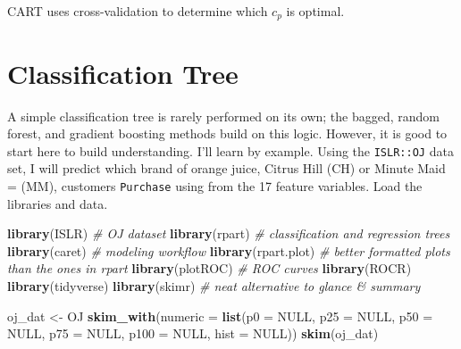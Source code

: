 \documentclass[]{book}
\newenvironment{Shaded}{\begin{snugshade}}{\end{snugshade}}
\newcommand{\CommentTok}[1]{\textcolor[rgb]{0.56,0.35,0.01}{\textit{#1}}}
\newcommand{\DataTypeTok}[1]{\textcolor[rgb]{0.13,0.29,0.53}{#1}}
\newcommand{\KeywordTok}[1]{\textcolor[rgb]{0.13,0.29,0.53}{\textbf{#1}}}
\newcommand{\NormalTok}[1]{#1}
\newcommand{\OtherTok}[1]{\textcolor[rgb]{0.56,0.35,0.01}{#1}}
\newcommand{\StringTok}[1]{\textcolor[rgb]{0.31,0.60,0.02}{#1}}
\begin{document}
CART uses cross-validation to determine which \(c_p\) is optimal.

\hypertarget{classification-tree}{%
\section{Classification Tree}\label{classification-tree}}

A simple classification tree is rarely performed on its own; the bagged, random forest, and gradient boosting methods build on this logic. However, it is good to start here to build understanding. I'll learn by example. Using the \texttt{ISLR::OJ} data set, I will predict which brand of orange juice, Citrus Hill (CH) or Minute Maid = (MM), customers \texttt{Purchase} using from the 17 feature variables. Load the libraries and data.

\begin{Shaded}
\begin{Highlighting}[]
\KeywordTok{library}\NormalTok{(ISLR)  }\CommentTok{# OJ dataset}
\KeywordTok{library}\NormalTok{(rpart)  }\CommentTok{# classification and regression trees }
\KeywordTok{library}\NormalTok{(caret)  }\CommentTok{# modeling workflow}
\KeywordTok{library}\NormalTok{(rpart.plot)  }\CommentTok{# better formatted plots than the ones in rpart}
\KeywordTok{library}\NormalTok{(plotROC)  }\CommentTok{# ROC curves}
\KeywordTok{library}\NormalTok{(ROCR)}
\KeywordTok{library}\NormalTok{(tidyverse)}
\KeywordTok{library}\NormalTok{(skimr)  }\CommentTok{# neat alternative to glance & summary}

\NormalTok{oj_dat <-}\StringTok{ }\NormalTok{OJ}
\KeywordTok{skim_with}\NormalTok{(}\DataTypeTok{numeric =} \KeywordTok{list}\NormalTok{(}\DataTypeTok{p0 =} \OtherTok{NULL}\NormalTok{, }\DataTypeTok{p25 =} \OtherTok{NULL}\NormalTok{, }\DataTypeTok{p50 =} \OtherTok{NULL}\NormalTok{, }\DataTypeTok{p75 =} \OtherTok{NULL}\NormalTok{, }
                                \DataTypeTok{p100 =} \OtherTok{NULL}\NormalTok{, }\DataTypeTok{hist =} \OtherTok{NULL}\NormalTok{))}
\KeywordTok{skim}\NormalTok{(oj_dat)}
\end{Highlighting}
\end{Shaded}
\end{document}

